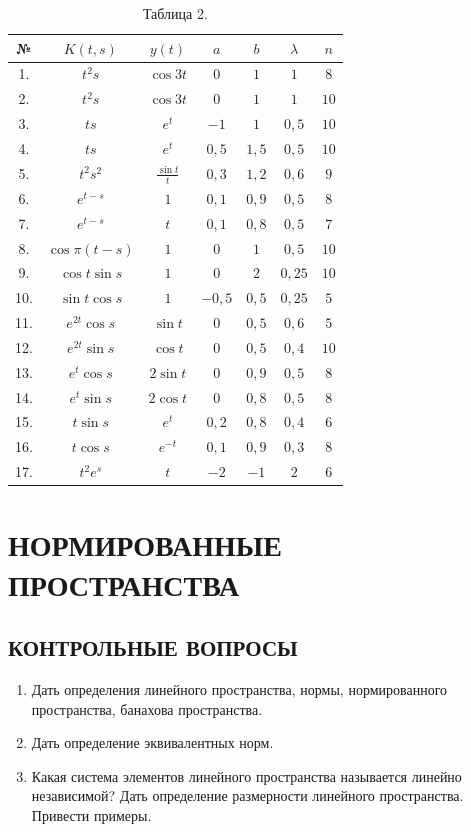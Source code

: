 \documentclass[12pt,a4paper]{article}
\begin{document}
\begin{table}[ht!]
\centering
\caption*{Таблица 2.}
\begin{tabular}{|c|c|c|c|c|c|c|}
\hline
№ & $K(t,s)$ & $y(t)$ & $a$ & $b$ & $\lambda$ & $n$ \\
\hline
1. & $t^{2}s$ & $\cos 3t$ & $0$ & $1$ & $1$ & $8$ \\
\hline
2. & $t^{2}s$ & $\cos 3t$ & $0$ & $1$ & $1$ & $10$ \\
\hline
3. & $ts$ & $e^{t}$ & $-1$ & $1$ & $0,5$ & $10$ \\
\hline
4. & $ts$ & $e^{t}$ & $0,5$ & $1,5$ & $0,5$ & $10$ \\
\hline
5. & $t^{2}s^{2}$ & $\frac{\sin t}{t}$ & $0,3$ & $1,2$ & $0,6$ & $9$ \\
\hline
6. & $e^{t-s}$ & $1$ & $0,1$ & $0,9$ & $0,5$ & $8$ \\
\hline
7. & $e^{t-s}$ & $t$ & $0,1$ & $0,8$ & $0,5$ & $7$ \\
\hline
8. & $\cos \pi(t-s)$ & $1$ & $0$ & $1$ & $0,5$ & $10$ \\
\hline
9. & $\cos t \sin s$ & $1$ & $0$ & $2$ & $0,25$ & $10$ \\
\hline
10. & $\sin t \cos s$ & $1$ & $-0,5$ & $0,5$ & $0,25$ & $5$ \\
\hline
11. & $e^{2t}\cos s$ & $\sin t$ & $0$ & $0,5$ & $0,6$ & $5$ \\
\hline
12. & $e^{2t}\sin s$ & $\cos t$ & $0$ & $0,5$ & $0,4$ & $10$ \\
\hline
13. & $e^{t}\cos s$ & $2\sin t$ & $0$ & $0,9$ & $0,5$ & $8$ \\
\hline
14. & $e^{t}\sin s$ & $2\cos t$ & $0$ & $0,8$ & $0,5$ & $8$ \\
\hline
15. & $t\sin s$ & $e^{t}$ & $0,2$ & $0,8$ & $0,4$ & $6$ \\
\hline
16. & $t\cos s$ & $e^{-t}$ & $0,1$ & $0,9$ & $0,3$ & $8$ \\
\hline
17. & $t^{2}e^{s}$ & $t$ & $-2$ & $-1$ & $2$ & $6$ \\
\hline
\end{tabular}
\end{table}

\section{НОРМИРОВАННЫЕ ПРОСТРАНСТВА}

\subsection*{КОНТРОЛЬНЫЕ ВОПРОСЫ}
\begin{enumerate}
\item Дать определения линейного пространства, нормы, нормированного пространства, банахова пространства.
\item Дать определение эквивалентных норм.
\item Какая система элементов линейного пространства называется линейно независимой? Дать определение размерности линейного пространства. Привести примеры.
\end{enumerate}
\end{document}
